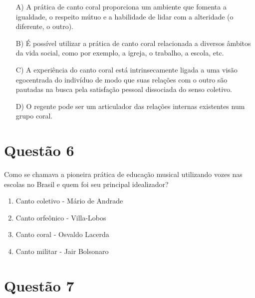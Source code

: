 \documentclass[a4paper, 12pt, openright, oneside, english, brazil, article]{abntex2}
\begin{document}
	\begin{enumerate}
		\item [A)] A prática de canto coral proporciona um ambiente que fomenta a igualdade, o respeito mútuo e a habilidade de lidar com a alteridade (o diferente, o outro).
		\item [B)] É possível utilizar a prática de canto coral relacionada a diversos âmbitos da vida social, como por exemplo, a igreja, o trabalho, a escola, etc.
		\item [C)] A experiência do canto coral está intrinsecamente ligada a uma visão egocentrada do indivíduo de modo que suas relações com o outro são pautadas na busca pela satisfação pessoal dissociada do senso coletivo.
		\item [D)] O regente pode ser um articulador das relações internas existentes num grupo coral.
	\end{enumerate}

	\section{Questão 6}
	
	Como se chamava a pioneira prática de educação musical utilizando vozes nas escolas no Brasil e quem foi seu principal idealizador?
	
	\begin{enumerate}
		\item Canto coletivo - Mário de Andrade
		\item Canto orfeônico - Villa-Lobos
		\item Canto coral - Osvaldo Lacerda
		\item Canto militar - Jair Bolsonaro
	\end{enumerate}
	
	
	\section{Questão 7}
	
	
	



	
\end{document}
